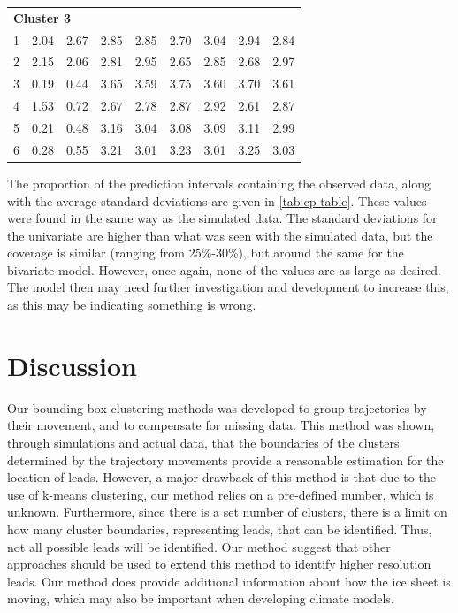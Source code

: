 \documentclass[12pt]{article}
\begin{document}
\begin{table}
\begin{tabular}[t]{rrrrrrrrr}
\multicolumn{9}{l}{\textbf{Cluster 3}}\\
\hspace{1em}1 & 2.04 & 2.67 & 2.85 & 2.85 & 2.70 & 3.04 & 2.94 & 2.84\\
\hspace{1em}2 & 2.15 & 2.06 & 2.81 & 2.95 & 2.65 & 2.85 & 2.68 & 2.97\\
\hspace{1em}3 & 0.19 & 0.44 & 3.65 & 3.59 & 3.75 & 3.60 & 3.70 & 3.61\\
\hspace{1em}4 & 1.53 & 0.72 & 2.67 & 2.78 & 2.87 & 2.92 & 2.61 & 2.87\\
\hspace{1em}5 & 0.21 & 0.48 & 3.16 & 3.04 & 3.08 & 3.09 & 3.11 & 2.99\\
\hspace{1em}6 & 0.28 & 0.55 & 3.21 & 3.01 & 3.23 & 3.01 & 3.25 & 3.03\\
\bottomrule
\end{tabular}
\end{table}

The proportion of the prediction intervals containing the observed data,
along with the average standard deviations are given in
\cref{tab:cp-table}. These values were found in the same way as the
simulated data. The standard deviations for the univariate are higher
than what was seen with the simulated data, but the coverage is similar
(ranging from 25\%-30\%), but around the same for the bivariate model.
However, once again, none of the values are as large as desired. The
model then may need further investigation and development to increase
this, as this may be indicating something is wrong.

\hypertarget{discussion}{%
\section{Discussion}\label{discussion}}

Our bounding box clustering methods was developed to group trajectories
by their movement, and to compensate for missing data. This method was
shown, through simulations and actual data, that the boundaries of the
clusters determined by the trajectory movements provide a reasonable
estimation for the location of leads. However, a major drawback of this
method is that due to the use of k-means clustering, our method relies
on a pre-defined number, which is unknown. Furthermore, since there is a
set number of clusters, there is a limit on how many cluster boundaries,
representing leads, that can be identified. Thus, not all possible leads
will be identified. Our method suggest that other approaches should be
used to extend this method to identify higher resolution leads. Our
method does provide additional information about how the ice sheet is
moving, which may also be important when developing climate models.
\end{document}
